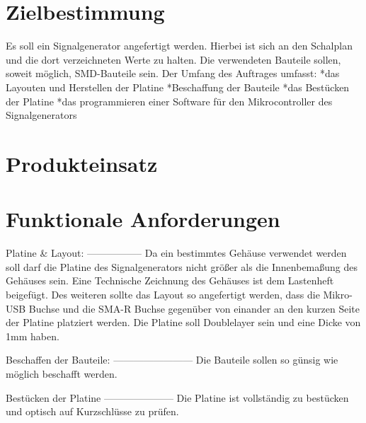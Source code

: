 \documentclass[a4paper,12pt]{article}
\title{\projekt}
\author{\authorName}
\begin{document}
 \maketitle
 \setcounter{page}{2}
 \tableofcontents          %
 \clearpage
 
\section{Zielbestimmung}
Es soll ein Signalgenerator angefertigt werden. Hierbei ist sich an den Schalplan und die dort verzeichneten Werte zu halten.
Die verwendeten Bauteile sollen, soweit möglich, SMD-Bauteile sein.
Der Umfang des Auftrages umfasst:
*das Layouten und Herstellen der Platine
*Beschaffung der Bauteile
*das Bestücken der Platine
*das programmieren einer Software für den Mikrocontroller des Signalgenerators

\section{Produkteinsatz}


\section{Funktionale Anforderungen}

Platine & Layout:
-----------------
Da ein bestimmtes Gehäuse verwendet werden soll darf die Platine des Signalgenerators nicht größer als
die Innenbemaßung des Gehäuses sein. Eine Technische Zeichnung des Gehäuses ist dem Lastenheft beigefügt.
Des weiteren sollte das Layout so angefertigt werden, dass die Mikro-USB Buchse und die SMA-R Buchse gegenüber
von einander an den kurzen Seite der Platine platziert werden.
Die Platine soll Doublelayer sein und eine Dicke von 1mm haben.

Beschaffen der Bauteile:
------------------------
Die Bauteile sollen so günsig wie möglich beschafft werden. 

Bestücken der Platine
---------------------
Die Platine ist vollständig zu bestücken und optisch auf Kurzschlüsse zu prüfen.
\end{document}
